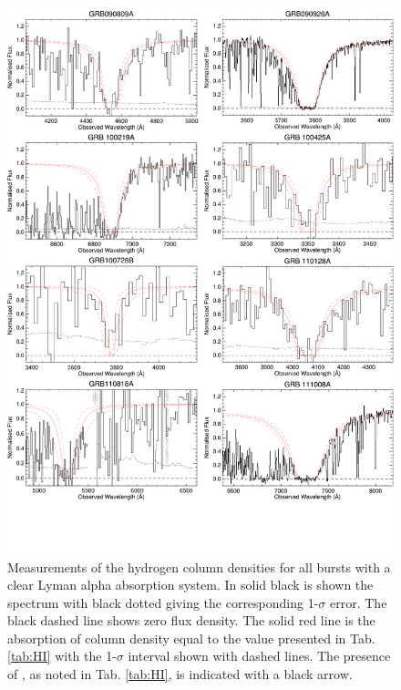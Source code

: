 \documentclass[longauth]{aa}    %
\begin{document}
\begin{figure}[!h]
	\centering
	\includegraphics[page=1, width=0.85\linewidth]{figures/HI_measurements.pdf}
	\caption{Measurements of the hydrogen column densities for all bursts with a
		clear Lyman alpha absorption system. In solid black is shown the spectrum with
		black dotted giving the corresponding 1-$\sigma$ error. The black dashed line shows zero
		flux density. The solid red line is the absorption of column density equal to
		the value presented in Tab. \ref{tab:HI} with the 1-$\sigma$ interval shown
		with dashed lines. The presence of \lya, as noted in Tab. \ref{tab:HI}, is indicated with a black arrow.}
	\label{fig:HI1}
\end{figure}
\clearpage
\end{document}
